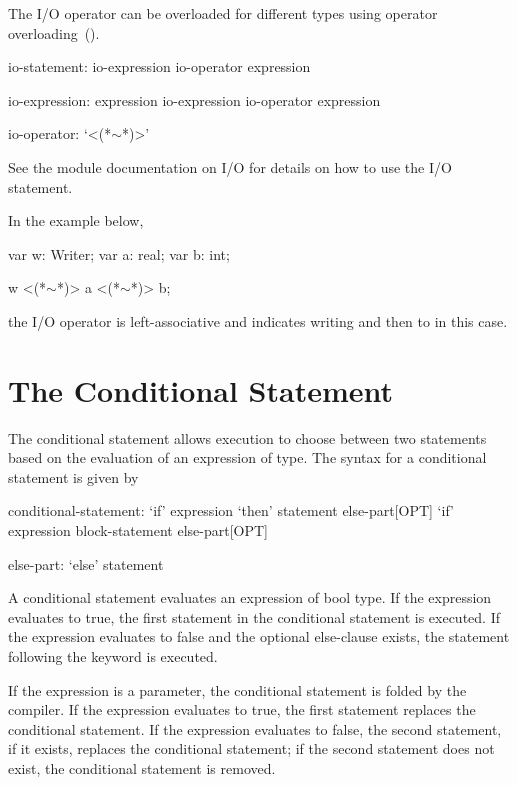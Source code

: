 The I/O operator can be overloaded for different types using operator
overloading~().
\begin{syntax}
io-statement:
  io-expression io-operator expression

io-expression:
  expression
  io-expression io-operator expression

io-operator:
  `<(*$\sim$*)>'
\end{syntax}

See the module documentation on I/O for details on how to use the
I/O statement.

\begin{example}
In the example below,
\begin{chapel}
var w: Writer;
var a: real;
var b: int;

w <(*$\sim$*)> a <(*$\sim$*)> b;
\end{chapel}
the I/O operator is left-associative and indicates writing 
and then  to  in this case.
\end{example}


\section{The Conditional Statement}
\label{The_Conditional_Statement}

The conditional statement allows execution to choose between two
statements based on the evaluation of an expression of 
type. The syntax for a conditional statement is given by
\begin{syntax}
conditional-statement:
  `if' expression `then' statement else-part[OPT]
  `if' expression block-statement else-part[OPT]

else-part:
  `else' statement
\end{syntax}

A conditional statement evaluates an expression of bool type. If the
expression evaluates to true, the first statement in the conditional
statement is executed.  If the expression evaluates to false and the
optional else-clause exists, the statement following the
 keyword is executed.

If the expression is a parameter, the conditional statement is folded
by the compiler. If the expression evaluates to true, the first
statement replaces the conditional statement. If the expression
evaluates to false, the second statement, if it exists, replaces the
conditional statement; if the second statement does not exist, the
conditional statement is removed.

